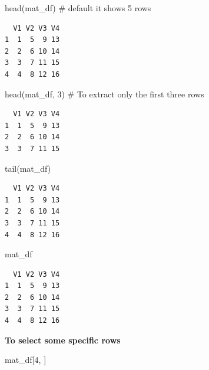 \documentclass[
  letterpaper,
  DIV=11,
  numbers=noendperiod]{scrreprt}
\newenvironment{Shaded}{\begin{snugshade}}{\end{snugshade}}
\newcommand{\CommentTok}[1]{\textcolor[rgb]{0.37,0.37,0.37}{#1}}
\newcommand{\DecValTok}[1]{\textcolor[rgb]{0.68,0.00,0.00}{#1}}
\newcommand{\FunctionTok}[1]{\textcolor[rgb]{0.28,0.35,0.67}{#1}}
\newcommand{\NormalTok}[1]{\textcolor[rgb]{0.00,0.23,0.31}{#1}}
\begin{document}
\begin{Shaded}
\begin{Highlighting}[]
\FunctionTok{head}\NormalTok{(mat\_df) }\CommentTok{\# default it shows 5 rows}
\end{Highlighting}
\end{Shaded}

\begin{verbatim}
  V1 V2 V3 V4
1  1  5  9 13
2  2  6 10 14
3  3  7 11 15
4  4  8 12 16
\end{verbatim}

\begin{Shaded}
\begin{Highlighting}[]
\FunctionTok{head}\NormalTok{(mat\_df, }\DecValTok{3}\NormalTok{) }\CommentTok{\# To extract only the first three rows }
\end{Highlighting}
\end{Shaded}

\begin{verbatim}
  V1 V2 V3 V4
1  1  5  9 13
2  2  6 10 14
3  3  7 11 15
\end{verbatim}

\begin{Shaded}
\begin{Highlighting}[]
\FunctionTok{tail}\NormalTok{(mat\_df)}
\end{Highlighting}
\end{Shaded}

\begin{verbatim}
  V1 V2 V3 V4
1  1  5  9 13
2  2  6 10 14
3  3  7 11 15
4  4  8 12 16
\end{verbatim}

\begin{Shaded}
\begin{Highlighting}[]
\NormalTok{mat\_df}
\end{Highlighting}
\end{Shaded}

\begin{verbatim}
  V1 V2 V3 V4
1  1  5  9 13
2  2  6 10 14
3  3  7 11 15
4  4  8 12 16
\end{verbatim}

\textbf{To select some specific rows}

\begin{Shaded}
\begin{Highlighting}[]
\NormalTok{mat\_df[}\DecValTok{4}\NormalTok{, ]}
\end{Highlighting}
\end{Shaded}
\end{document}
